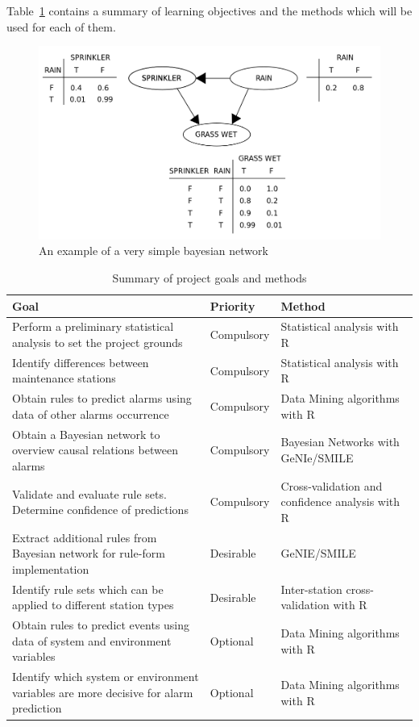 \documentclass[a4paper,12pt]{article}
\begin{document}
Table~\ref{tab:objectives_methods} contains a summary of learning objectives and the methods which will be used for each of them.


\begin{figure}[hbtp]
\includegraphics[width=\textwidth]{img/bayesian_example.png}
\caption{An example of a very simple bayesian network} \label{fig:bayesian_example}
\end{figure}

\begin{table}
\begin{tabularx}{\textwidth}{|X|l|X|}
\hline Goal & Priority & Method \\ 
\hline Perform a preliminary statistical analysis to set the project grounds & Compulsory & Statistical analysis with R \\ 
\hline Identify differences between maintenance stations & Compulsory & Statistical analysis with R \\ 
\hline Obtain rules to predict alarms using data of other alarms occurrence & Compulsory & Data Mining algorithms with R \\ 
\hline Obtain a Bayesian network to overview causal relations between alarms & Compulsory & Bayesian Networks with GeNIe/SMILE \\ 
\hline Validate and evaluate rule sets. Determine confidence of predictions & Compulsory & Cross-validation and confidence analysis with R \\ 
\hline Extract additional rules from Bayesian network for rule-form implementation & Desirable & GeNIE/SMILE \\ 
\hline Identify rule sets which can be applied to different station types & Desirable & Inter-station cross-validation with R \\ 
\hline Obtain rules to predict events using data of system and environment variables & Optional & Data Mining algorithms with R \\ 
\hline Identify which system or environment variables are more decisive for alarm prediction & Optional & Data Mining algorithms with R \\ 
\hline 

\end{tabularx} 
\caption{Summary of project goals and methods} \label{tab:objectives_methods}
\end{table}
\end{document}
